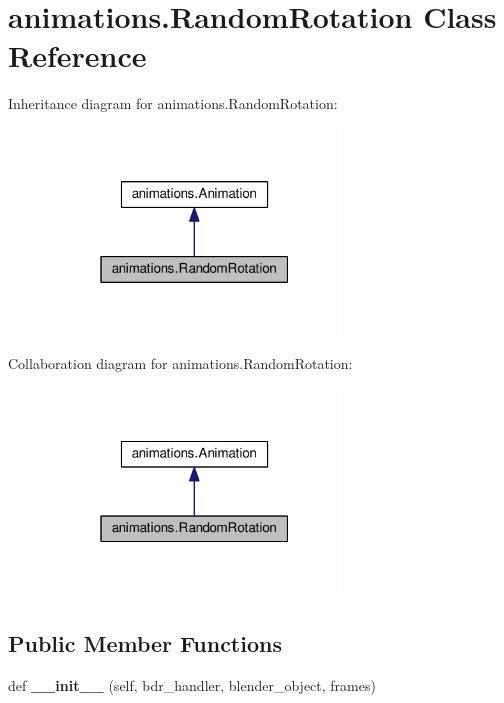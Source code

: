 \hypertarget{classanimations_1_1RandomRotation}{}\section{animations.\+Random\+Rotation Class Reference}
\label{classanimations_1_1RandomRotation}


Inheritance diagram for animations.\+Random\+Rotation\+:\nopagebreak
\begin{figure}[H]
\begin{center}
\leavevmode
\includegraphics[width=220pt]{classanimations_1_1RandomRotation__inherit__graph}
\end{center}
\end{figure}


Collaboration diagram for animations.\+Random\+Rotation\+:\nopagebreak
\begin{figure}[H]
\begin{center}
\leavevmode
\includegraphics[width=220pt]{classanimations_1_1RandomRotation__coll__graph}
\end{center}
\end{figure}
\subsection*{Public Member Functions}
\begin{DoxyCompactItemize}
\item 
def {\bfseries \+\_\+\+\_\+init\+\_\+\+\_\+} (self, bdr\+\_\+handler, blender\+\_\+object, frames)\hypertarget{classanimations_1_1RandomRotation_ab61c1388a3fe39fd64de957e30ce14d7}{}\label{classanimations_1_1RandomRotation_ab61c1388a3fe39fd64de957e30ce14d7}

\end{DoxyCompactItemize}
